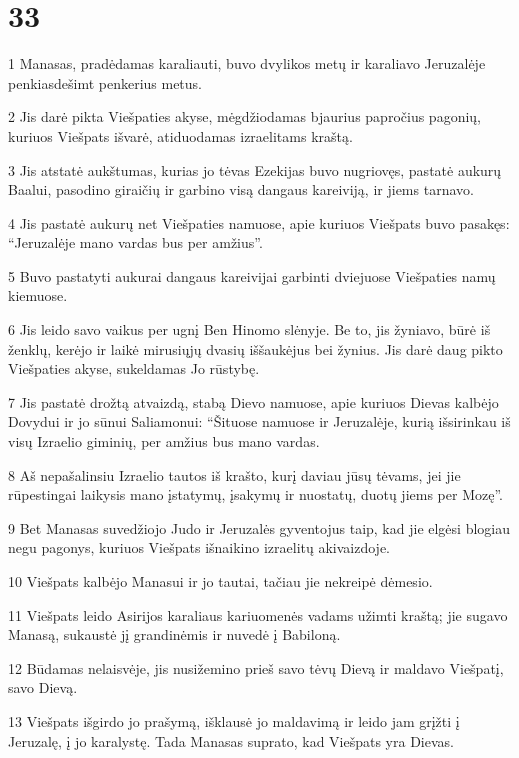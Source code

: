 \chapter{33}


\par 1 Manasas, pradėdamas karaliauti, buvo dvylikos metų ir karaliavo Jeruzalėje penkiasdešimt penkerius metus. 
\par 2 Jis darė pikta Viešpaties akyse, mėgdžiodamas bjaurius papročius pagonių, kuriuos Viešpats išvarė, atiduodamas izraelitams kraštą. 
\par 3 Jis atstatė aukštumas, kurias jo tėvas Ezekijas buvo nugriovęs, pastatė aukurų Baalui, pasodino giraičių ir garbino visą dangaus kareiviją, ir jiems tarnavo. 
\par 4 Jis pastatė aukurų net Viešpaties namuose, apie kuriuos Viešpats buvo pasakęs: “Jeruzalėje mano vardas bus per amžius”. 
\par 5 Buvo pastatyti aukurai dangaus kareivijai garbinti dviejuose Viešpaties namų kiemuose. 
\par 6 Jis leido savo vaikus per ugnį Ben Hinomo slėnyje. Be to, jis žyniavo, būrė iš ženklų, kerėjo ir laikė mirusiųjų dvasių iššaukėjus bei žynius. Jis darė daug pikto Viešpaties akyse, sukeldamas Jo rūstybę. 
\par 7 Jis pastatė drožtą atvaizdą, stabą Dievo namuose, apie kuriuos Dievas kalbėjo Dovydui ir jo sūnui Saliamonui: “Šituose namuose ir Jeruzalėje, kurią išsirinkau iš visų Izraelio giminių, per amžius bus mano vardas. 
\par 8 Aš nepašalinsiu Izraelio tautos iš krašto, kurį daviau jūsų tėvams, jei jie rūpestingai laikysis mano įstatymų, įsakymų ir nuostatų, duotų jiems per Mozę”. 
\par 9 Bet Manasas suvedžiojo Judo ir Jeruzalės gyventojus taip, kad jie elgėsi blogiau negu pagonys, kuriuos Viešpats išnaikino izraelitų akivaizdoje. 
\par 10 Viešpats kalbėjo Manasui ir jo tautai, tačiau jie nekreipė dėmesio. 
\par 11 Viešpats leido Asirijos karaliaus kariuomenės vadams užimti kraštą; jie sugavo Manasą, sukaustė jį grandinėmis ir nuvedė į Babiloną. 
\par 12 Būdamas nelaisvėje, jis nusižemino prieš savo tėvų Dievą ir maldavo Viešpatį, savo Dievą. 
\par 13 Viešpats išgirdo jo prašymą, išklausė jo maldavimą ir leido jam grįžti į Jeruzalę, į jo karalystę. Tada Manasas suprato, kad Viešpats yra Dievas. 
